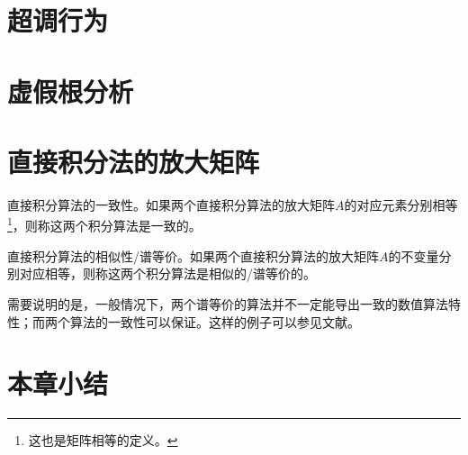 \section{超调行为}

\section{虚假根分析}

\section{直接积分法的放大矩阵}

\begin{definition}
直接积分算法的一致性\cite{Hoff1988}。如果两个直接积分算法的放大矩阵$A$的对应元素分别相等\footnote{这也是矩阵相等的定义。}，则称这两个积分算法是一致的。
\end{definition}

\begin{definition}
直接积分算法的相似性/谱等价\cite{Hoff1988}。如果两个直接积分算法的放大矩阵$A$的不变量分别对应相等，则称这两个积分算法是相似的/谱等价的。
\end{definition}

需要说明的是，一般情况下，两个谱等价的算法并不一定能导出一致的数值算法特性；而两个算法的一致性可以保证。这样的例子可以参见文献。

\section{本章小结}




